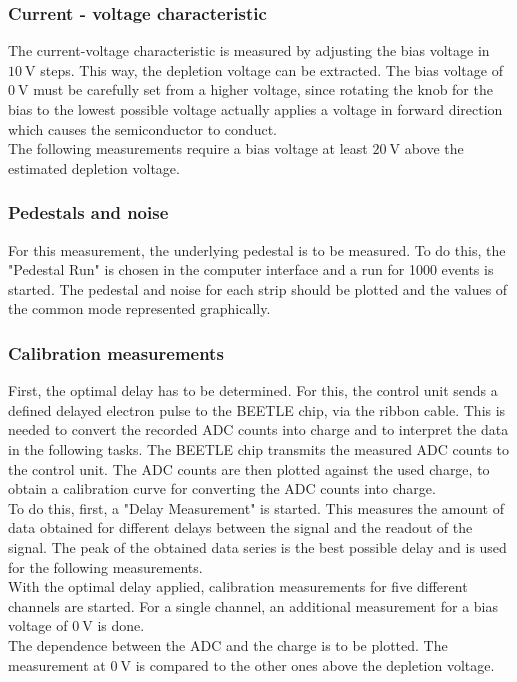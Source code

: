 \subsubsection{Current - voltage characteristic}
\label{measure:1}
The current-voltage characteristic is measured by adjusting the bias voltage in $\qty{10}{\volt}$ steps. This way,
the depletion voltage can be extracted. The bias voltage of $\qty{0}{\volt}$ must be carefully set from a higher voltage,
since rotating the knob for the bias to the lowest possible voltage actually applies a voltage in forward direction which causes
the semiconductor to conduct.\\
The following measurements require a bias voltage at least $\qty{20}{\volt}$ above the estimated depletion voltage.

\subsubsection{Pedestals and noise}
\label{measure:2}
For this measurement, the underlying pedestal is to be measured. To do this, the "Pedestal Run" is chosen in the computer
interface and a run for 1000 events is started. The pedestal and noise for each strip should be plotted and the values of the
common mode represented graphically.

\subsubsection{Calibration measurements}
\label{measure:3}
First, the optimal delay has to be determined. For this, the control unit sends a defined delayed electron pulse to the BEETLE chip,
via the ribbon cable. This is needed to convert the recorded ADC counts into charge and to interpret the data in the following
tasks. The BEETLE chip transmits the measured ADC counts to the control unit. The ADC counts are then plotted against
the used charge, to obtain a calibration curve for converting the ADC counts into charge.\\
To do this, first, a "Delay Measurement" is started. This measures the amount of data obtained for different delays between
the signal and the readout of the signal. The peak of the obtained data series is the best possible delay and is used 
for the following measurements.\\
With the optimal delay applied, calibration measurements for five different channels are started. For a single channel, an additional
measurement for a bias voltage of $\qty{0}{\volt}$ is done.\\
The dependence between the ADC and the charge is to be plotted. The measurement at $\qty{0}{\volt}$ is compared to the other ones above 
the depletion voltage.

